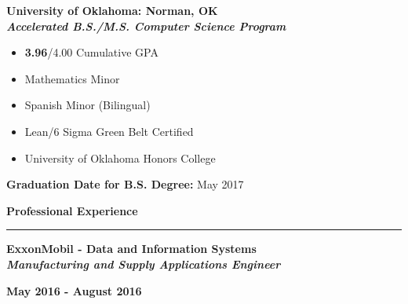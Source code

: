 \documentclass[10pt,letterpaper]{article}
\begin{document}
	\begin{minipage}[t]{0.5\textwidth}
          \begin{flushleft}
            \textbf{University of Oklahoma: Norman, OK}\\
            \textbf{\textit{Accelerated B.S./M.S. Computer Science
                Program}}
            \begin{itemize}[noitemsep,topsep=0pt]
              \setlength\itemsep{-0.10em}
            \item \textbf{3.96}/4.00 Cumulative GPA
            \item Mathematics Minor
            \item Spanish Minor (Bilingual)
            \item Lean/6 Sigma Green Belt Certified
            \item University of Oklahoma Honors College
            \end{itemize}
          \end{flushleft}
	\end{minipage}
	\begin{minipage}[t]{0.47\textwidth}
          \begin{flushright}
            \textbf{Graduation Date for B.S. Degree:} May 2017\\
          \end{flushright}
	\end{minipage}
	
	\medskip
	
	\begin{large}
          \textbf{Professional Experience}
	\end{large}
	
	\smallskip \hrule \smallskip

        \begin{minipage}[t]{0.53\textwidth}
          \begin{flushleft}
            \textbf{ExxonMobil - Data and Information Systems}\\
            \textbf{\textit{Manufacturing and Supply Applications Engineer}}\\
          \end{flushleft}
	\end{minipage}
	\begin{minipage}[t]{0.44\textwidth}
          \begin{flushright}
            \textbf{May 2016 - August 2016}
          \end{flushright}
	\end{minipage}
\end{document}
